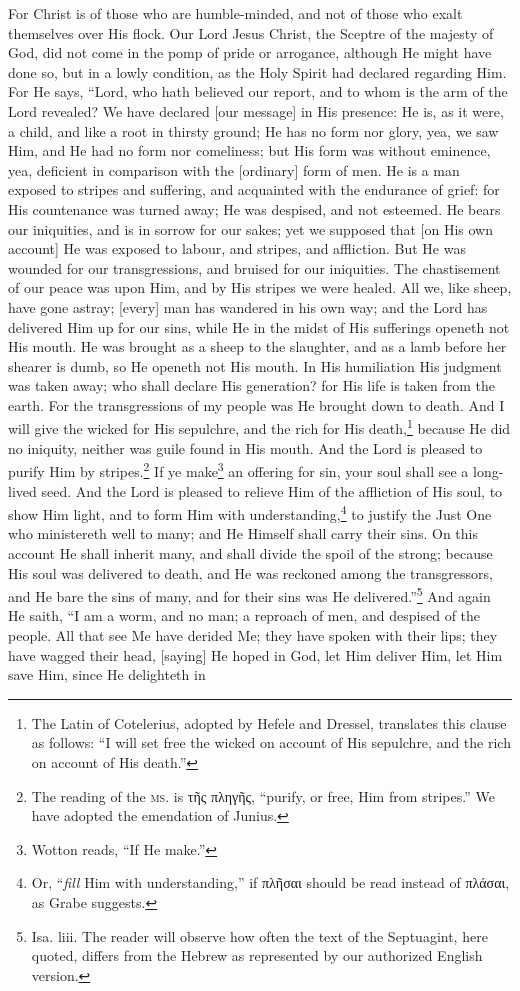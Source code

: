 For Christ is of those who are humble-minded, and not of those who exalt themselves over His flock. Our Lord Jesus Christ, the Sceptre of the majesty of God, did not come in the pomp of pride or arrogance, although He might have done so, but in a lowly condition, as the Holy Spirit had declared regarding Him. For He says, “Lord, who hath believed our report, and to whom is the arm of the Lord revealed? We have declared [our message] in His presence: He is, as it were, a child, and like a root in thirsty ground; He has no form nor glory, yea, we saw Him, and He had no form nor comeliness; but His form was without eminence, yea, deficient in comparison with the [ordinary] form of men. He is a man exposed to stripes and suffering, and acquainted with the endurance of grief: for His countenance was turned away; He was despised, and not esteemed. He bears our iniquities, and is in sorrow for our sakes; yet we supposed that [on His own account] He was exposed to labour, and stripes, and affliction. But He was wounded for our transgressions, and bruised for our iniquities. The chastisement of our peace was upon Him, and by His stripes we were healed. All we, like sheep, have gone astray; [every] man has wandered in his own way; and the Lord has delivered Him up for our sins, while He in the midst of His sufferings openeth not His mouth. He was brought as a sheep to the slaughter, and as a lamb before her shearer is dumb, so He openeth not His mouth. In His humiliation His judgment was taken away; who shall declare His generation? for His life is taken from the earth. For the transgressions of my people was He brought down to death. And I will give the wicked for His sepulchre, and the rich for His death,\footnote{The Latin of Cotelerius, adopted by Hefele and Dressel, translates this clause as follows: “I will set free the wicked on account of His sepulchre, and the rich on account of His death.”} because He did no iniquity, neither was guile found in His mouth. And the Lord is pleased to purify Him by stripes.\footnote{The reading of the \textsc{ms.} is \textgreek{τῆς πληγῆς}, “purify, or free, Him from stripes.” We have adopted the emendation of Junius.} If ye make\footnote{Wotton reads, “If He make.”} an offering for sin, your soul shall see a long-lived seed. And the Lord is pleased to relieve Him of the affliction of His soul, to show Him light, and to form Him with understanding,\footnote{Or, “\emph{fill} Him with understanding,” if \textgreek{πλῆσαι} should be read instead of \textgreek{πλάσαι}, as Grabe suggests.} to justify the Just One who ministereth well to many; and He Himself shall carry their sins. On this account He shall inherit many, and shall divide the spoil of the strong; because His soul was delivered to death, and He was reckoned among the transgressors, and He bare the sins of many, and for their sins was He delivered.”\footnote{Isa. liii. The reader will observe how often the text of the Septuagint, here quoted, differs from the Hebrew as represented by our authorized English version.} And again He saith, “I am a worm, and no man; a reproach of men, and despised of the people. All that see Me have derided Me; they have spoken with their lips; they have wagged their head, [saying] He hoped in God, let Him deliver Him, let Him save Him, since He delighteth in 